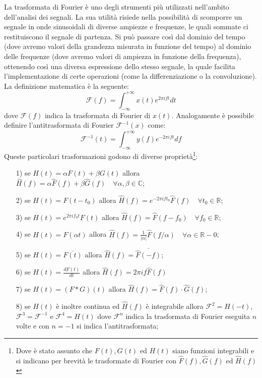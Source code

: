 \documentclass[a4paper, 12pt]{book}
\begin{document}
La trasformata di Fourier è uno degli strumenti più utilizzati nell'ambito dell'analisi dei segnali.
La sua utilità risiede nella possibilità di scomporre un segnale in onde sinusoidali di diverse ampiezze e frequenze, le quali sommate ci restituiscono il segnale di partenza.
Si può passare così dal dominio del tempo (dove avremo valori della grandezza misurata in funzione del tempo) al dominio delle frequenze (dove avremo valori di ampiezza in funzione della frequenza), ottenendo così una diversa espressione dello stesso segnale, la quale facilita l'implementazione di certe operazioni (come la differenziazione o la convoluzione).
La definizione matematica è la seguente:
\begin{equation}
	\label{eq:Fourier}
	\mathcal{F}(f) = \int_{-\infty}^{+\infty}x(t)e^{2 \pi i f t} dt
\end{equation}
dove $\mathcal{F}(f)$ indica la trasformata di Fourier di $x(t)$.
Analogamente è possibile definire l'antitrasformata di Fourier $\mathcal{F}^{-1}(x)$ come:
\begin{equation}
	\mathcal{F}^{-1}(t) = \int_{-\infty}^{+\infty}y(f)e^{-2 \pi i f t} df
\end{equation}
Queste particolari trasformazioni godono di diverse proprietà\footnote{Dove è stato assunto che $F(t),G(t)$ ed $H(t)$ siano funzioni integrabili e si indicano per brevità le trasformate di Fourier con $\hat{F}(f), \hat{G}(f)$ ed $\hat{H}(f)$ }:
\begin{itemize}
	\item[1)] se $H(t)=\alpha F(t)+\beta G(t)$ allora $\hat{H}(f) = \alpha \hat{F}(f)+					  \beta \hat{G}(f) \quad \forall \alpha,\beta \in \mathbb{C}$;
	\item[2)] se $H(t)=F(t-t_0)$ allora $\hat{H}(f) = e^{-2\pi ift_0}\hat{F}(f) \quad 					  \forall t_0 \in \mathbb{R}$;
	\item[3)] se $H(t)=e^{2\pi if_0t}F(t)$ allora $\hat{H}(f) = \hat{F}(f-f_0) \quad 					  \forall f_0 \in \mathbb{R}$;
	\item[4)] se $H(t) = F(\alpha t)$ allora $\hat{H}(f) = \frac{1}{|\alpha|} \hat{F}					  (f/\alpha) \quad \forall \alpha \in \mathbb{R}-{0}$;
	\item[5)] se $H(t) = \overline{F(t)}$ allora $\hat{H}(f) = \overline{ \hat{F} (-f)}					  $;
	\item[6)] se $H(t)=\frac{dF(t)}{dt}$ allora $\hat{H}(f) = 2\pi if\hat{F}(f)$
	\item[7)] se $H(t)=(F*G)(t)$ allora $\hat{H}(f) = \hat{F}(f) \cdot \hat{G}(f)$;
	\item[8)] se $H(t)$ è inoltre continua ed $\hat{H}(f)$ è integrabile allora $						  \mathcal{F}^2 = H(-t)$, $\mathcal{F}^3 = \mathcal{F}^{-1} $ e $							  \mathcal{F}^4 = H(t)$ dove $\mathcal{F}^n$ indica la trasformata di 						  Fourier eseguita $n$ volte e con $n=-1$ si indica l'antitrasformata;
\end{itemize}
\end{document}
